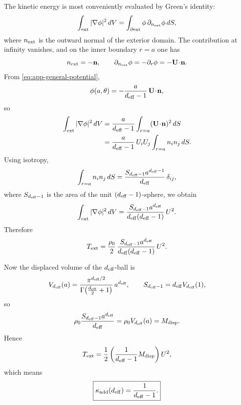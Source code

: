 \documentclass[11pt]{article}
\newcommand{\kadd}{\kappa_{\mathrm{add}}}
\begin{document}
The kinetic energy is most conveniently evaluated by Green's identity:
\begin{equation}
\int_{\rm ext}|\nabla\phi|^2\,dV
=
\int_{\partial {\rm ext}}\phi\,\partial_{n_{\rm ext}}\phi\,dS,
\label{eq:app-green-identity}
\end{equation}
where \(n_{\rm ext}\) is the outward normal of the exterior domain. The contribution at
infinity vanishes, and on the inner boundary \(r=a\) one has
\begin{equation}
n_{\rm ext}=-\mathbf n,
\qquad
\partial_{n_{\rm ext}}\phi=-\partial_r\phi=-\mathbf U\!\cdot\!\mathbf n.
\label{eq:app-normal-convention}
\end{equation}
From \eqref{eq:app-general-potential},
\begin{equation}
\phi(a,\theta)=-\frac{a}{d_{\rm eff}-1}\,\mathbf U\!\cdot\!\mathbf n,
\end{equation}
so
\begin{align}
\int_{\rm ext}|\nabla\phi|^2\,dV
&=
\frac{a}{d_{\rm eff}-1}
\int_{r=a}(\mathbf U\!\cdot\!\mathbf n)^2\,dS
\nonumber\\
&=
\frac{a}{d_{\rm eff}-1}\,
U_iU_j
\int_{r=a}n_i n_j\,dS.
\label{eq:app-surface-eval}
\end{align}
Using isotropy,
\begin{equation}
\int_{r=a}n_i n_j\,dS
=
\frac{S_{d_{\rm eff}-1}a^{d_{\rm eff}-1}}{d_{\rm eff}}\,
\delta_{ij},
\label{eq:app-sphere-isotropy}
\end{equation}
where \(S_{d_{\rm eff}-1}\) is the area of the unit \((d_{\rm eff}-1)\)-sphere, we obtain
\begin{equation}
\int_{\rm ext}|\nabla\phi|^2\,dV
=
\frac{S_{d_{\rm eff}-1}a^{d_{\rm eff}}}{d_{\rm eff}(d_{\rm eff}-1)}\,U^2.
\label{eq:app-integral-result}
\end{equation}
Therefore
\begin{equation}
T_{\rm ext}
=
\frac{\rho_0}{2}\,
\frac{S_{d_{\rm eff}-1}a^{d_{\rm eff}}}{d_{\rm eff}(d_{\rm eff}-1)}\,U^2.
\label{eq:app-Text-general}
\end{equation}

Now the displaced volume of the \(d_{\rm eff}\)-ball is
\begin{equation}
V_{d_{\rm eff}}(a)
=
\frac{\pi^{d_{\rm eff}/2}}{\Gamma\!\left(\frac{d_{\rm eff}}{2}+1\right)}\,a^{d_{\rm eff}},
\qquad
S_{d_{\rm eff}-1}=d_{\rm eff}V_{d_{\rm eff}}(1),
\label{eq:app-volume-area}
\end{equation}
so
\begin{equation}
\rho_0 \frac{S_{d_{\rm eff}-1}a^{d_{\rm eff}}}{d_{\rm eff}}
=
\rho_0 V_{d_{\rm eff}}(a)
=
M_{\rm disp}.
\label{eq:app-disp-identity}
\end{equation}
Hence
\begin{equation}
T_{\rm ext}
=
\frac12
\left(
\frac{1}{d_{\rm eff}-1}M_{\rm disp}
\right)U^2,
\label{eq:app-Text-final-general}
\end{equation}
which means
\begin{equation}
\boxed{
\kadd(d_{\rm eff})=\frac{1}{d_{\rm eff}-1}.
}
\label{eq:app-kadd-general}
\end{equation}
\end{document}
